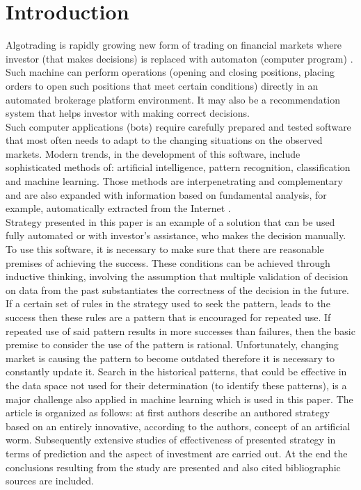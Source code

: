 \documentclass[runningheads,a4paper]{llncs}
\begin{document}
\section{Introduction}

Algotrading is rapidly growing new form of trading on financial markets where investor (that makes decisions) is replaced with automaton (computer program) \cite{Leshik2011}. Such machine can perform operations (opening and closing positions, placing orders to open such positions that meet certain conditions) directly in an automated brokerage platform environment. It may also be a recommendation system that helps investor with making correct decisions.\\

Such computer applications (bots) require carefully prepared and tested software that most often needs to adapt to the changing situations on the observed markets. Modern trends, in the development of this software, include sophisticated methods of: artificial intelligence, pattern recognition, classification and machine learning. Those methods are interpenetrating and complementary and are also expanded with information based on fundamental analysis, for example, automatically extracted from the Internet \cite{elder}\cite{Wilinski2014}\cite{Schwager1996}.\\

Strategy presented in this paper is an example of a solution that can be used fully automated or with investor’s assistance, who makes the decision manually. To use this software, it is necessary to make sure that there are reasonable premises of achieving the success. These conditions can be achieved through inductive thinking, involving the assumption that multiple validation of decision on data from the past substantiates the correctness of the decision in the future. If a certain set of rules in the strategy used to seek the pattern, leads to the success then these rules are a pattern that is encouraged for repeated use. If repeated use of said pattern results in more successes than failures, then the basic premise to consider the use of the pattern is rational\cite{bishop2006pattern}. Unfortunately, changing market is causing the pattern to become outdated therefore it is necessary to constantly update it. Search in the historical patterns, that could be effective in the data space not used for their determination (to identify these patterns), is a major challenge also applied in machine learning which is used in this paper.
The article is organized as follows: at first authors describe an authored strategy based on an entirely innovative, according to the authors, concept of an artificial worm. Subsequently extensive studies of effectiveness of presented strategy in terms of prediction and the aspect of investment are carried out. At the end the conclusions resulting from the study are presented and also cited bibliographic sources are included.
\end{document}
